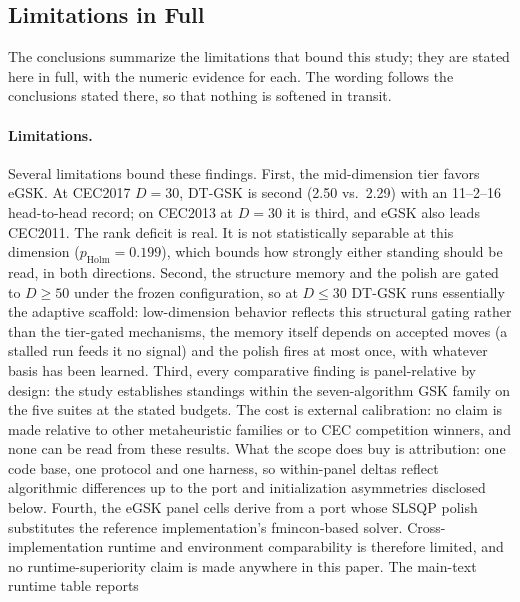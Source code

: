 \documentclass[algorithms,article,submit,moreauthors,pdftex]{Definitions/mdpi}
\newcommand{\dtgsk}{DT-GSK}
\newcommand{\egsk}{eGSK}
\begin{document}
\subsection{Limitations in Full}\label{sec:repro:limitations}

The conclusions summarize the limitations that bound this study; they are
stated here in full, with the numeric evidence for each. The wording
follows the conclusions stated there, so that nothing is
softened in transit.

\paragraph{Limitations.}
Several limitations bound these findings. First, the mid-dimension tier
favors \egsk{}. At CEC2017 $D = 30$, \dtgsk{} is second (2.50
vs.\ 2.29) with an 11--2--16 head-to-head record; on CEC2013 at
$D = 30$ it is third, and \egsk{} also leads CEC2011. The rank deficit
is real. It is not statistically separable at this dimension
($p_{\mathrm{Holm}} = 0.199$), which bounds how strongly either standing
should be read, in both directions. %
Second, the structure memory and the polish are gated to $D \geq 50$
under the frozen configuration, so at $D \leq 30$ \dtgsk{} runs essentially
the adaptive scaffold: low-dimension behavior reflects this structural
gating rather than the tier-gated mechanisms, the memory itself depends
on accepted moves (a stalled run feeds it no signal) and the
polish fires at most once, with whatever basis has been
learned. %
Third, every comparative finding is panel-relative by design: the study
establishes standings within the seven-algorithm GSK family on the five
suites at the stated budgets. The cost is external calibration: no
claim is made relative to other metaheuristic families or to CEC
competition winners, and none can be read from these results. What the
scope does buy is attribution: one code base, one protocol and one
harness, so within-panel deltas reflect algorithmic differences up to the
port and initialization asymmetries disclosed below. %
Fourth, the \egsk{} panel cells derive from a port whose SLSQP polish
substitutes the reference implementation's fmincon-based solver. Cross-implementation
runtime and environment comparability is therefore limited, and no
runtime-superiority claim is made anywhere in this paper. The main-text runtime table reports
\end{document}
